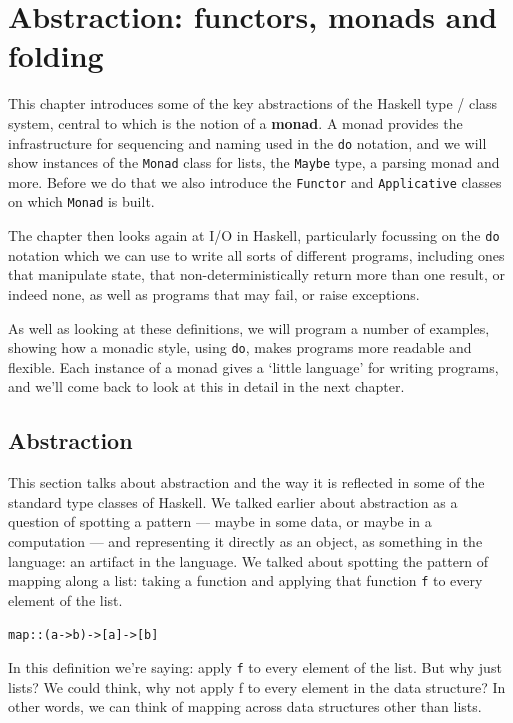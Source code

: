 
\chapter{Abstraction: functors, monads and folding}
\chapstart
\label{actions}

This chapter introduces some of the key abstractions of the Haskell type / class system, central to which is the notion of a \textbf{monad}. A monad provides the infrastructure for sequencing and naming used in the \texttt{do} notation, and we will show instances of the \texttt{Monad} class for lists, the \texttt{Maybe} type, a parsing monad and more. Before we do that we also introduce the \texttt{Functor} and \texttt{Applicative} classes on which \texttt{Monad} is built.

The chapter then looks again at I/O in Haskell, particularly focussing on the \texttt{do} notation which we can use to write all sorts of different programs, including ones that manipulate state, that non-deterministically return more than one result, or indeed none, as well as programs that may fail, or raise exceptions.

As well as looking at these definitions, we will program a number of examples, showing how a monadic style, using \texttt{do}, makes programs more readable and flexible.
Each instance of a monad gives a `little language' for writing programs, and we'll come back to look at this in detail in the next chapter.

\begin{webvideos}
\end{webvideos}

\section{Abstraction}
\label{abstraction}

This section talks about abstraction and the way it is reflected in some of the standard type classes of Haskell. We talked earlier about abstraction as a question of spotting a pattern — maybe in some data, or maybe in a computation — and representing it directly as an object, as something in the language: an artifact in the language. We talked about spotting the pattern of mapping along a list: taking a function and applying that function \texttt{f} to every element of the list. 
\begin{alltt}
map :: (a -> b) -> [a] -> [b]
\end{alltt}
In this definition we're saying: apply \texttt{f} to every element of the list. But why just lists? We could think, why not apply f to every element in the data structure? In other words, we can think of mapping across data structures other than lists.


